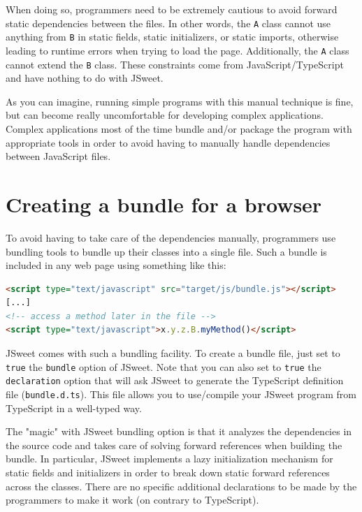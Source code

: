 \documentclass[a4paper]{report}
\begin{document}
When doing so, programmers need to be extremely cautious to avoid forward static dependencies between the files. In other words, the \texttt{A} class cannot use anything from \texttt{B} in static fields, static initializers, or static imports, otherwise leading to runtime errors when trying to load the page. Additionally,  the \texttt{A} class cannot extend the \texttt{B} class. These constraints come from JavaScript/TypeScript and have nothing to do with JSweet.

As you can imagine, running simple programs with this manual technique is fine, but can become really uncomfortable for developing complex applications. Complex applications most of the time bundle and/or package the program with appropriate tools in order to avoid having to manually handle dependencies between JavaScript files.

\section{Creating a bundle for a browser}

To avoid having to take care of the dependencies manually, programmers use bundling tools to bundle up their classes into a single file. Such a bundle is included in any web page using something like this:

\begin{lstlisting}[language=html]
<script type="text/javascript" src="target/js/bundle.js"></script>
[...]
<!-- access a method later in the file -->
<script type="text/javascript">x.y.z.B.myMethod()</script>
\end{lstlisting}

JSweet comes with such a bundling facility. To create a bundle file, just set to \texttt{true} the \texttt{bundle} option of JSweet. Note that you can also set to \texttt{true} the \texttt{declaration} option that will ask JSweet to generate the TypeScript definition file (\texttt{bundle.d.ts}). This file allows you to use/compile your JSweet program from TypeScript in a well-typed way. 

The "magic" with JSweet bundling option is that it analyzes the dependencies in the source code and takes care of solving forward references when building the bundle. In particular, JSweet implements a lazy initialization mechanism for static fields and initializers in order to break down static forward references across the classes. There are no specific additional declarations to be made by the programmers to make it work (on contrary to TypeScript). 
\end{document}
